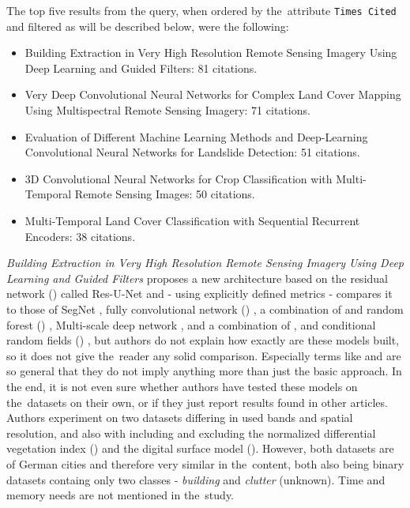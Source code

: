 \noindent The top five results from the query, when ordered by the~attribute \verb|Times Cited| and filtered as will be described below, were the following:

\begin{itemize}
	\item Building Extraction in Very High Resolution Remote Sensing Imagery Using Deep Learning and Guided Filters: 81 citations. \cite{res-u-net}
	\item Very Deep Convolutional Neural Networks for Complex Land Cover Mapping Using Multispectral Remote Sensing Imagery: 71 citations. \cite{very-deep-cnn-lc}
	\item Evaluation of Different Machine Learning Methods and Deep-Learning Convolutional Neural Networks for Landslide Detection: 51 citations. \cite{landslide-evaluation}
	\item 3D Convolutional Neural Networks for Crop Classification with Multi-Temporal Remote Sensing Images: 50 citations. \cite{3d-cnn-crop}
	\item Multi-Temporal Land Cover Classification with Sequential Recurrent Encoders: 38 citations. \cite{multi-temporal-sequential-recurrent}
\end{itemize}

\textit{Building Extraction in Very High Resolution Remote Sensing Imagery Using Deep Learning and Guided Filters} proposes a new  architecture based on the residual network () \cite{resnet} called Res-U-Net and - using explicitly defined metrics - compares it to those of SegNet \cite{segnet}, fully convolutional network () \cite{fcn}, a combination of  and random forest () \cite{rf}, Multi-scale deep network \cite{hierarchical-labeling}, and a combination of ,  and conditional random fields () \cite{hierarchical-labeling}, but authors do not explain how exactly are these models built, so it does not give the~reader any solid comparison. Especially terms like  and  are so general that they do not imply anything more than just the basic approach. In the end, it is not even sure whether authors have tested these models on the~datasets on their own, or if they just report results found in other articles. Authors experiment on two datasets differing in used bands and spatial resolution, and also with including and excluding the normalized differential vegetation index () and the digital surface model (). However, both datasets are of German cities and therefore very similar in the~content, both also being binary datasets containg only two classes - \textit{building} and \textit{clutter} (unknown). Time and memory needs are not mentioned in the~study.

